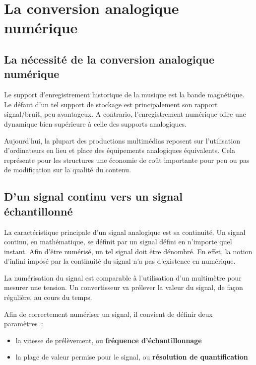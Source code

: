 \documentclass[
]{book}
\providecommand{\tightlist}{%
  \setlength{\itemsep}{0pt}\setlength{\parskip}{0pt}}
\begin{document}
\hypertarget{la-conversion-analogique-numuxe9rique}{%
\chapter{La conversion analogique numérique}\label{la-conversion-analogique-numuxe9rique}}

\hypertarget{la-nuxe9cessituxe9-de-la-conversion-analogique-numuxe9rique}{%
\section{La nécessité de la conversion analogique numérique}\label{la-nuxe9cessituxe9-de-la-conversion-analogique-numuxe9rique}}

Le support d'enregistrement historique de la musique est la bande magnétique. Le défaut d'un tel support de stockage est principalement son rapport signal/bruit, peu avantageux. A contrario, l'enregistrement numérique offre une dynamique bien supérieure à celle des supports analogiques.

Aujourd'hui, la plupart des productions multimédias reposent sur l'utilisation d'ordinateurs en lieu et place des équipements analogiques équivalents. Cela représente pour les structures une économie de coût importante pour peu ou pas de modification sur la qualité du contenu.

\hypertarget{dun-signal-continu-vers-un-signal-uxe9chantillonnuxe9}{%
\section{D'un signal continu vers un signal échantillonné}\label{dun-signal-continu-vers-un-signal-uxe9chantillonnuxe9}}

La caractéristique principale d'un signal analogique est sa continuité. Un signal continu, en mathématique, se définit par un signal défini en n'importe quel instant. Afin d'être numérisé, un tel signal doit être dénombré. En effet, la notion d'infini imposé par la continuité du signal n'a pas d'existence en numérique.

La numérisation du signal est comparable à l'utilisation d'un multimètre pour mesurer une tension. Un convertisseur va prélever la valeur du signal, de façon régulière, au cours du temps.

Afin de correctement numériser un signal, il convient de définir deux paramètres~:

\begin{itemize}
\tightlist
\item
  la vitesse de prélèvement, ou \textbf{fréquence d'échantillonnage}
\item
  la plage de valeur permise pour le signal, ou \textbf{résolution de quantification}
\end{itemize}
\end{document}
